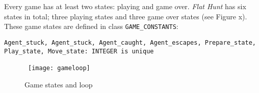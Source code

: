 Every game has at least two states: playing and game over. \emph{Flat Hunt} has six states in total; three playing states and three game over states (see Figure x). These game states are defined in class \texttt{GAME\_CONSTANTS}:

\texttt{Agent\_stuck, Agent\_stuck, Agent\_caught, Agent\_escapes, Prepare\_state, Play\_state, Move\_state: INTEGER is unique}

\begin{figure}[h]
  \centerline{\hbox{
    \texttt{[image: gameloop]}
  }}
\caption{Game states and loop}
\label{gameloop}
\end{figure}
